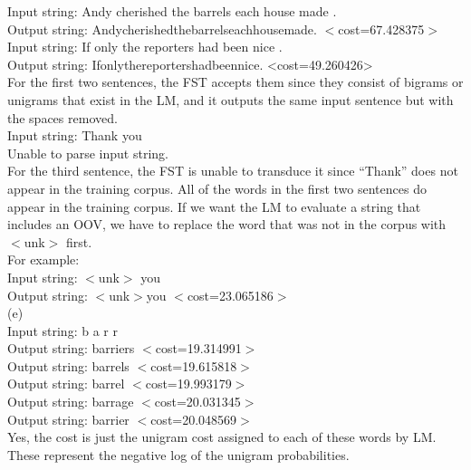 \documentclass[11pt]{article} %
\begin{document}
Input string: Andy cherished the barrels each house made .\\
Output string: Andycherishedthebarrelseachhousemade. $<$cost=67.428375$>$\\

Input string: If only the reporters had been nice .\\
Output string: Ifonlythereportershadbeennice. <cost=49.260426>\\

For the first two sentences, the FST accepts them since they consist of bigrams or unigrams that exist in the LM, and it outputs the same input sentence but with the spaces removed. \\

Input string: Thank you\\
Unable to parse input string.\\

For the third sentence, the FST is unable to transduce it since ``Thank” does not appear in the training corpus. All of the words in the first two sentences do appear in the training corpus. If we want the LM to evaluate a string that includes an OOV, we have to replace the word that was not in the corpus with $<$unk$>$ first.\\
For example:\\

Input string: $<$unk$>$ you\\
Output string: $<$unk$>$you $<$cost=23.065186$>$\\

(e)\\
Input string: b a r r \\
Output string: barriers $<$cost=19.314991$>$\\
Output string: barrels $<$cost=19.615818$>$\\
Output string: barrel $<$cost=19.993179$>$\\
Output string: barrage $<$cost=20.031345$>$\\
Output string: barrier $<$cost=20.048569$>$\\

Yes, the cost is just the unigram cost assigned to each of these words by LM. These represent the negative log of the unigram probabilities.\\

\newpage

\section{}
\end{document}

